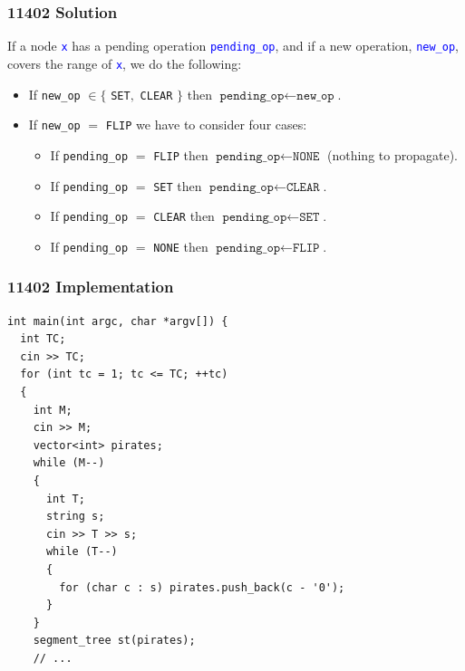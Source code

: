 \documentclass{beamer}
\begin{document}
\begin{frame}%
\frametitle{11402 Solution}

If a node \textcolor{blue}{\texttt{x}} has a pending operation \textcolor{blue}{\texttt{pending\_op}}, and if a new operation, \textcolor{blue}{\texttt{new\_op}},
covers the range of \textcolor{blue}{\texttt{x}}, we do the following:

\begin{itemize}

\item<2-> If \texttt{new\_op} $\in \{$ \texttt{SET}$,$ \texttt{CLEAR} $\}$ then $\texttt{pending\_op} \leftarrow \texttt{new\_op}$.

\vspace{0.1cm}

\item<3-> If \texttt{new\_op} $=$ \texttt{FLIP} we have to consider four cases:

\begin{itemize}

\item<4-> If \texttt{pending\_op} $=$ \texttt{FLIP} then $\texttt{pending\_op} \leftarrow \texttt{NONE}$ (nothing to propagate).

\vspace{0.11cm}

\item<5-> If \texttt{pending\_op} $=$ \texttt{SET} then $\texttt{pending\_op} \leftarrow \texttt{CLEAR}$.

\vspace{0.11cm}

\item<6-> If \texttt{pending\_op} $=$ \texttt{CLEAR} then $\texttt{pending\_op} \leftarrow \texttt{SET}$.

\vspace{0.11cm}

\item<7-> If \texttt{pending\_op} $=$ \texttt{NONE} then $\texttt{pending\_op} \leftarrow \texttt{FLIP}$.

\end{itemize}

\end{itemize}

\end{frame}

\begin{frame}[containsverbatim]
\frametitle{11402 Implementation}

\scriptsize

\begin{lstlisting}[mathescape]
int main(int argc, char *argv[]) {
  int TC;
  cin >> TC;
  for (int tc = 1; tc <= TC; ++tc)
  {
    int M;
    cin >> M;
    vector<int> pirates;
    while (M--)
    {
      int T;
      string s;
      cin >> T >> s;
      while (T--)
      {
        for (char c : s) pirates.push_back(c - '0');
      }
    }
    segment_tree st(pirates);
    // ...
\end{lstlisting}

\end{frame}
\end{document}
